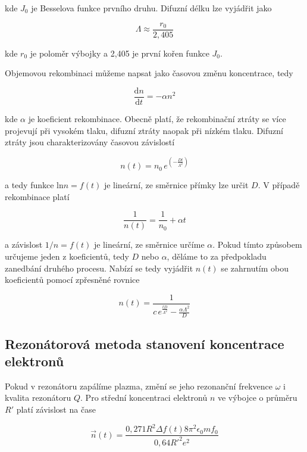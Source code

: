 \documentclass[a4paper,12pt]{article}
\begin{document}
kde $J_0$ je Besselova funkce prvního druhu. Difuzní délku lze vyjádřit jako

\begin{equation}
	\Lambda \approx \frac{r_0}{2,405}
\end{equation}

kde $r_0$ je poloměr výbojky a 2,405 je první kořen funkce $J_0$.

Objemovou rekombinaci můžeme napsat jako časovou změnu koncentrace, tedy

\begin{equation}
	\frac{\text{d}n}{\text{d}t} = -\alpha n^2
\end{equation}

kde $\alpha$ je koeficient rekombinace. Obecně platí, že rekombinační ztráty se více projevují při vysokém tlaku, difuzní ztráty naopak při nízkém tlaku. Difuzní ztráty jsou charakterizovány časovou závislostí 

\begin{equation}
	n(t) = n_0\,e^{\left( -\frac{Dt}{\Lambda^2}\right)}
\end{equation}

a tedy funkce $\text{ln}n = f(t)$ je lineární, ze směrnice přímky lze určit $D$. V případě rekombinace platí

\begin{equation}
	\frac{1}{n(t)} = \frac{1}{n_0} + \alpha t
\end{equation} 

a závislost $1/n = f(t)$ je lineární, ze směrnice určíme $\alpha$. Pokud tímto způsobem určujeme jeden z koeficientů, tedy $D$ nebo $\alpha$, děláme to za předpokladu zanedbání druhého procesu. Nabízí se tedy vyjádřit $n(t)$ se zahrnutím obou koeficientů pomocí zpřesněné rovnice

\begin{equation}
	n(t) = \frac{1}{c\,e^{\frac{tD}{\Lambda^2}}-\frac{\alpha \Lambda^2}{D}}
	\label{zpresnena}
\end{equation}

\subsection{Rezonátorová metoda stanovení koncentrace elektronů}
Pokud v rezonátoru zapálíme plazma, změní se jeho rezonanční frekvence $\omega$ i kvalita rezonátoru $Q$. Pro střední koncentraci elektronů $n$ ve výbojce o průměru $R'$ platí závislost na čase

\begin{equation}
	\overrightarrow{n}(t) = \frac{0,271 R^2 \Delta f(t) 8 \pi^2 \epsilon_0 m f_0}{0,64 R'^2 e^2}
\end{equation}
\end{document}
